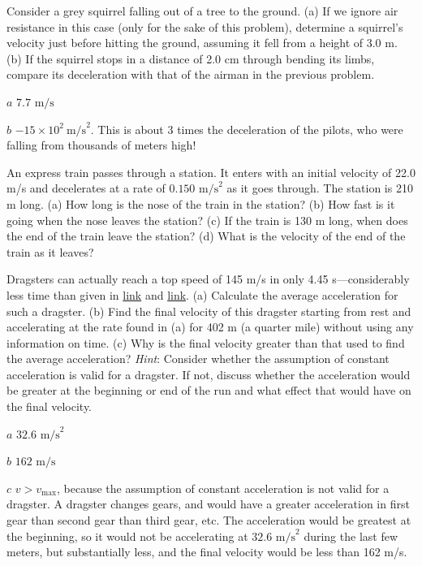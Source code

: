 \documentclass[
]{book}
\newenvironment{problems-exercises}{}{}
\begin{document}
\begin{problems-exercises}
\hypertarget{fs-id1164906495944}{}
\leavevmode\hypertarget{fs-id1164906495948}{}%
Consider a grey squirrel falling out of a tree to the ground. (a) If we
ignore air resistance in this case (only for the sake of this problem),
determine a squirrel's velocity just before hitting the ground,
assuming it fell from a height of 3.0 m. (b) If the squirrel stops in a
distance of 2.0 cm through bending its limbs, compare its deceleration
with that of the airman in the previous problem.

\leavevmode\hypertarget{fs-id1164906459010}{}%
\(a\) \({7\text{.}\text{7\ m/s}}{}\)

\(b\) \({{{- \text{15}} \times \text{10}^{2}}\ \text{m/s}^{2}}{}\). This
is about 3 times the deceleration of the pilots, who were falling from
thousands of meters high!

\hypertarget{fs-id1164906433746}{}
\leavevmode\hypertarget{fs-id1164906433747}{}%
An express train passes through a station. It enters with an initial
velocity of 22.0 m/s and decelerates at a rate of
\({0\text{.}\text{150\ m/s}^{2}}{}\) as it goes through. The station is
210 m long. (a) How long is the nose of the train in the station? (b)
How fast is it going when the nose leaves the station? (c) If the train
is 130 m long, when does the end of the train leave the station? (d)
What is the velocity of the end of the train as it leaves?

\hypertarget{fs-id1164906502756}{}
\leavevmode\hypertarget{fs-id1164906502757}{}%
Dragsters can actually reach a top speed of 145 m/s in only 4.45
s---considerably less time than given in
\protect\hyperlink{fs-id1164906457202}{link} and
\protect\hyperlink{fs-id1164906443776}{link}. (a) Calculate the
average acceleration for such a dragster. (b) Find the final velocity of
this dragster starting from rest and accelerating at the rate found in
(a) for 402 m (a quarter mile) without using any information on time.
(c) Why is the final velocity greater than that used to find the average
acceleration? \emph{Hint}: Consider whether the assumption of constant
acceleration is valid for a dragster. If not, discuss whether the
acceleration would be greater at the beginning or end of the run and
what effect that would have on the final velocity.

\leavevmode\hypertarget{fs-id1164906446759}{}%
\(a\) \({\text{32}\text{.}\text{6\ m/s}^{2}}{}\)

\(b\) \(\text{162\ m/s}{}\)

\(c\) \({v > v_{\text{max}}}{}\), because the assumption of constant
acceleration is not valid for a dragster. A dragster changes gears, and
would have a greater acceleration in first gear than second gear than
third gear, etc. The acceleration would be greatest at the beginning, so
it would not be accelerating at \({\text{32}\text{.}\text{6\ m/s}^{2}}{}\)
during the last few meters, but substantially less, and the final
velocity would be less than 162 m/s.


\end{problems-exercises}
\end{document}
